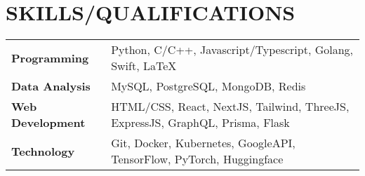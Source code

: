 \section{SKILLS/QUALIFICATIONS}

\small{
  \begin{tabularx}{\linewidth}{@{} p{3.5cm} X @{}}
    \textbf{Programming} & Python, C/C++, Javascript/Typescript, Golang, Swift, LaTeX \\
    \textbf{Data Analysis} & MySQL, PostgreSQL, MongoDB, Redis \\
    \textbf{Web Development} & HTML/CSS, React, NextJS, Tailwind, ThreeJS, ExpressJS, GraphQL, Prisma, Flask \\
    \textbf{Technology} & Git, Docker, Kubernetes, GoogleAPI, TensorFlow, PyTorch, Huggingface \\
  \end{tabularx}
}